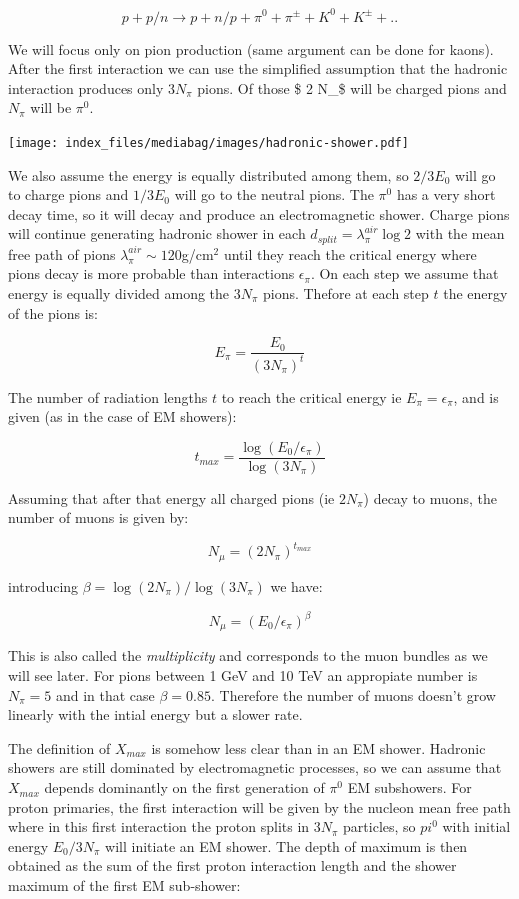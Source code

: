 \documentclass[
  letterpaper,
  DIV=11,
  numbers=noendperiod]{scrreprt}
\begin{document}
\[ p + p/n \rightarrow p + n/p + \pi^0 + \pi^{\pm} + K^0 + K^{\pm} + .. \]

We will focus only on pion production (same argument can be done for
kaons). After the first interaction we can use the simplified assumption
that the hadronic interaction produces only \(3N_\pi\) pions. Of those
\$ 2 N\_\pi\$ will be charged pions and \(N_\pi\) will be \(\pi^0\).

\begin{center}
\texttt{[image: index\_files/mediabag/images/hadronic-shower.pdf]}
\end{center}

We also assume the energy is equally distributed among them, so
\(2/3E_0\) will go to charge pions and \(1/3E_0\) will go to the neutral
pions. The \(\pi^0\) has a very short decay time, so it will decay and
produce an electromagnetic shower. Charge pions will continue generating
hadronic shower in each \(d_{split} = \lambda_{\pi}^{air} \log 2\) with
the mean free path of pions \(\lambda_\pi^{air} \sim 120\)g/cm\(^2\)
until they reach the critical energy where pions decay is more probable
than interactions \(\epsilon_\pi\). On each step we assume that energy
is equally divided among the \(3 N_\pi\) pions. Thefore at each step
\(t\) the energy of the pions is:

\[E_\pi = \frac{E_0}{(3N_\pi)^t} \]

The number of radiation lengths \(t\) to reach the critical energy ie
\(E_\pi = \epsilon_\pi\), and is given (as in the case of EM showers):

\[t_{max} = \frac{\log(E_0/\epsilon_\pi)}{\log(3N_\pi)}\]

Assuming that after that energy all charged pions (ie \(2N_\pi\)) decay
to muons, the number of muons is given by:

\[N_\mu =(2N_\pi)^{t_{max}}\]

introducing \(\beta = \log(2N_\pi)/\log(3N_\pi)\) we have:

\[N_\mu =(E_0/\epsilon_\pi)^\beta \]

This is also called the \emph{multiplicity} and corresponds to the muon
bundles as we will see later. For pions between 1 GeV and 10 TeV an
appropiate number is \(N_\pi = 5\) and in that case \(\beta = 0.85\).
Therefore the number of muons doesn't grow linearly with the intial
energy but a slower rate.

The definition of \(X_{max}\) is somehow less clear than in an EM
shower. Hadronic showers are still dominated by electromagnetic
processes, so we can assume that \(X_{max}\) depends dominantly on the
first generation of \(\pi^0\) EM subshowers. For proton primaries, the
first interaction will be given by the nucleon mean free path where in
this first interaction the proton splits in \(3N_\pi\) particles, so
\(pi^0\) with initial energy \(E_0/3N_\pi\) will initiate an EM shower.
The depth of maximum is then obtained as the sum of the first proton
interaction length and the shower maximum of the first EM sub-shower:
\end{document}
